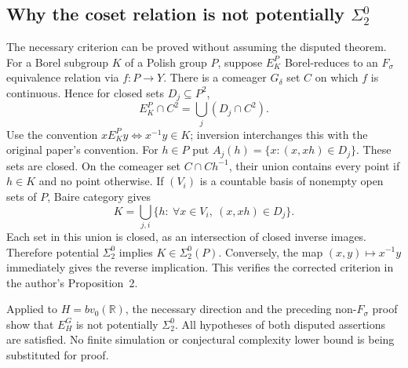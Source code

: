 \documentclass[10pt]{article}
\begin{document}
\subsection*{Why the coset relation is not potentially \(\Sigma^0_2\)}
The necessary criterion can be proved without assuming the disputed theorem. For a Borel subgroup \(K\) of a Polish group \(P\), suppose \(E_K^P\) Borel-reduces to an \(F_\sigma\) equivalence relation via \(f:P\to Y\). There is a comeager \(G_\delta\) set \(C\) on which \(f\) is continuous. Hence for closed sets \(D_j\subseteq P^2\), \[E_K^P\cap C^2=\bigcup_j(D_j\cap C^2).\] Use the convention \(xE_K^Py\iff x^{-1}y\in K\); inversion interchanges this with the original paper’s convention. For \(h\in P\) put \(A_j(h)=\{x:(x,xh)\in D_j\}\). These sets are closed. On the comeager set \(C\cap Ch^{-1}\), their union contains every point if \(h\in K\) and no point otherwise. If \((V_i)\) is a countable basis of nonempty open sets of \(P\), Baire category gives \[K=\bigcup_{j,i}\{h:\ \forall x\in V_i,\ (x,xh)\in D_j\}.\] Each set in this union is closed, as an intersection of closed inverse images. Therefore potential \(\Sigma^0_2\) implies \(K\in\Sigma^0_2(P)\). Conversely, the map \((x,y)\mapsto x^{-1}y\) immediately gives the reverse implication. This verifies the corrected criterion in the author’s Proposition 2.\par
Applied to \(H=bv_0(\mathbb R)\), the necessary direction and the preceding non-\(F_\sigma\) proof show that \(E_H^G\) is not potentially \(\Sigma^0_2\). All hypotheses of both disputed assertions are satisfied. No finite simulation or conjectural complexity lower bound is being substituted for proof.\par
\end{document}
